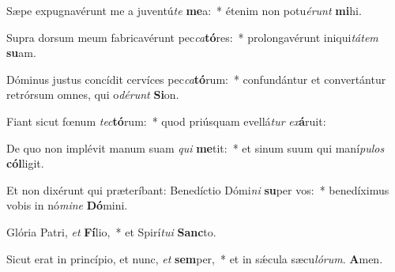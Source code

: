 Sæpe expugnavérunt me a juventú\textit{te} \textbf{me}a:~* étenim non potu\textit{é}\textit{runt} \textbf{mi}hi.

Supra dorsum meum fabricavérunt pec\textit{ca}\textbf{tó}res:~* prolongavérunt iniqui\textit{tá}\textit{tem} \textbf{su}am.

Dóminus justus concídit cervíces pec\textit{ca}\textbf{tó}rum:~* confundántur et convertántur retrórsum omnes, qui o\textit{dé}\textit{runt} \textbf{Si}on.

Fiant sicut fœnum \textit{tec}\textbf{tó}rum:~* quod priúsquam evellá\textit{tur} \textit{ex}\textbf{á}ruit:

De quo non implévit manum suam \textit{qui} \textbf{me}tit:~* et sinum suum qui maní\textit{pu}\textit{los} \textbf{cól}ligit.

Et non dixérunt qui præteríbant: Benedíctio Dómi\textit{ni} \textbf{su}per vos:~* benedíximus vobis in nó\textit{mi}\textit{ne} \textbf{Dó}mini.

Glória Patri, \textit{et} \textbf{Fí}lio,~* et Spirí\textit{tu}\textit{i} \textbf{Sanc}to.

Sicut erat in princípio, et nunc, \textit{et} \textbf{sem}per,~* et in sǽcula sæcu\textit{ló}\textit{rum}. \textbf{A}men.


